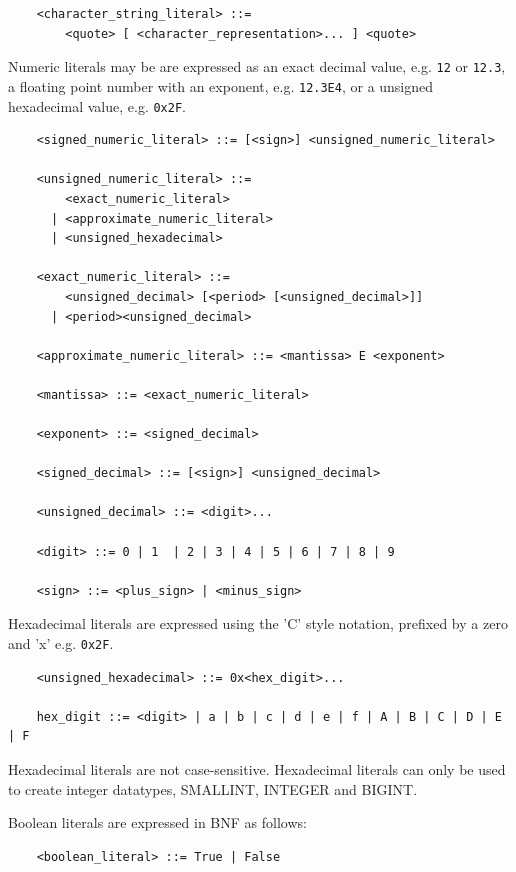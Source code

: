\documentclass[11pt,a4paper]{ivoa}
\begin{document}
\begin{verbatim}
    <character_string_literal> ::=
        <quote> [ <character_representation>... ] <quote>
\end{verbatim}

Numeric literals may be are expressed as an exact decimal value, e.g. \verb:12: or \verb:12.3:,
a floating point number with an exponent, e.g. \verb:12.3E4:, or a unsigned hexadecimal
value, e.g. \verb:0x2F:.

\begin{verbatim}
    <signed_numeric_literal> ::= [<sign>] <unsigned_numeric_literal>

    <unsigned_numeric_literal> ::= 
        <exact_numeric_literal>
      | <approximate_numeric_literal>
      | <unsigned_hexadecimal>
              
    <exact_numeric_literal> ::=
        <unsigned_decimal> [<period> [<unsigned_decimal>]]
      | <period><unsigned_decimal>

    <approximate_numeric_literal> ::= <mantissa> E <exponent>

    <mantissa> ::= <exact_numeric_literal>

    <exponent> ::= <signed_decimal>

    <signed_decimal> ::= [<sign>] <unsigned_decimal>

    <unsigned_decimal> ::= <digit>...

    <digit> ::= 0 | 1  | 2 | 3 | 4 | 5 | 6 | 7 | 8 | 9
    
    <sign> ::= <plus_sign> | <minus_sign>
\end{verbatim}

Hexadecimal literals are expressed using the 'C' style notation, prefixed by a zero and 'x' e.g. \verb:0x2F:.

\begin{verbatim}
    <unsigned_hexadecimal> ::= 0x<hex_digit>...

    hex_digit ::= <digit> | a | b | c | d | e | f | A | B | C | D | E | F
\end{verbatim}

Hexadecimal literals are not case-sensitive.
Hexadecimal literals can only be used to create integer datatypes, SMALLINT, INTEGER and BIGINT.

Boolean literals are expressed in BNF as follows:

\begin{verbatim}
    <boolean_literal> ::= True | False
\end{verbatim}
\end{document}
